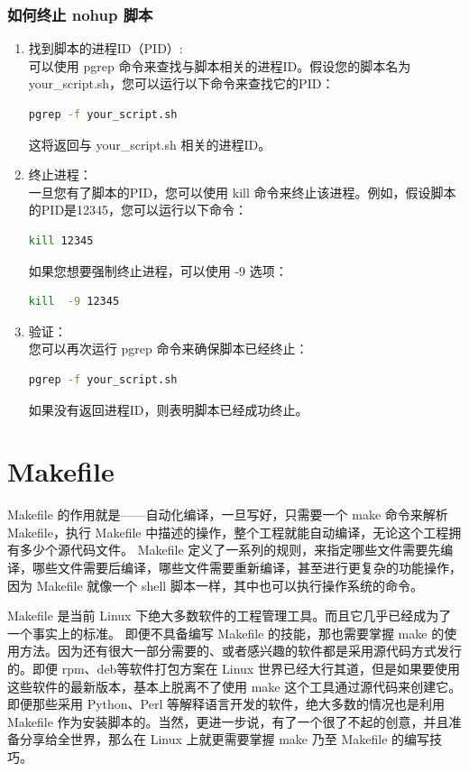 \subsubsection{如何终止 nohup 脚本}
\begin{enumerate}
\item 找到脚本的进程ID（PID）:\\
可以使用 pgrep 命令来查找与脚本相关的进程ID。假设您的脚本名为 your\_script.sh，您可以运行以下命令来查找它的PID：
\begin{lstlisting}[language=sh]
pgrep -f your_script.sh
\end{lstlisting}
这将返回与 your\_script.sh 相关的进程ID。

\item 终止进程：\\
一旦您有了脚本的PID，您可以使用 kill 命令来终止该进程。例如，假设脚本的PID是12345，您可以运行以下命令：
\begin{lstlisting}[language=sh]
kill 12345
\end{lstlisting}
如果您想要强制终止进程，可以使用 -9 选项：
\begin{lstlisting}[language=sh]
kill  -9 12345
\end{lstlisting}

\item  验证：\\
您可以再次运行 pgrep 命令来确保脚本已经终止：
\begin{lstlisting}[language=sh]
pgrep -f your_script.sh
\end{lstlisting}
如果没有返回进程ID，则表明脚本已经成功终止。

\end{enumerate}




\section{Makefile}
Makefile 的作用就是——自动化编译，一旦写好，只需要一个 make 命令来解析 Makefile，执行 Makefile 中描述的操作，整个工程就能自动编译，无论这个工程拥有多少个源代码文件。 Makefile 定义了一系列的规则，来指定哪些文件需要先编译，哪些文件需要后编译，哪些文件需要重新编译，甚至进行更复杂的功能操作，因为 Makefile 就像一个 shell 脚本一样，其中也可以执行操作系统的命令。

Makefile 是当前 Linux 下绝大多数软件的工程管理工具。而且它几乎已经成为了一个事实上的标准。
即便不具备编写 Makefile 的技能，那也需要掌握 make 的使用方法。因为还有很大一部分需要的、或者感兴趣的软件都是采用源代码方式发行的。即便 rpm、deb等软件打包方案在 Linux 世界已经大行其道，但是如果要使用这些软件的最新版本，基本上脱离不了使用 make 这个工具通过源代码来创建它。即便那些采用 Python、Perl 等解释语言开发的软件，绝大多数的情况也是利用 Makefile 作为安装脚本的。当然，更进一步说，有了一个很了不起的创意，并且准备分享给全世界，那么在 Linux 上就更需要掌握 make 乃至 Makefile 的编写技巧。

